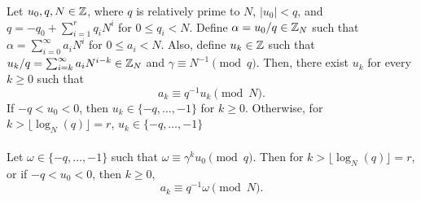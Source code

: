 \begin{theorem}\label{thm:10}
  Let $u_0,q,N\in\mathbb{Z}$, where $q$ is relatively prime to $N$,
  $\lvert u_0 \rvert < q$, and $q=-q_0+\sum_{i=1}^{r}q_iN^i$ for
  $0 \leq q_i < N$. Define $\alpha = u_0/q \in \mathbb{Z}_N$
  such that $\alpha = \sum_{i=0}^{\infty}a_iN^i$ for $0 \leq a_i < N$.
  Also, define $u_k\in\mathbb{Z}$ such that $u_k/q = \sum_{i=k}^{\infty}a_iN^{i-k} \in \mathbb{Z}_N$
  and $\gamma \equiv N^{-1} \pmod q$. Then,
  there exist $u_k$ for every $k\geq0$ such that
  \begin{equation}\label{eq:ak}
    a_k \equiv q^{-1}u_k \pmod N.
  \end{equation}
  If $-q<u_0<0$, then $u_k \in \{-q,\dots,-1\}$ for $k\geq0$.
  Otherwise, for $k>\lfloor \log_N(q) \rfloor=r$, $u_k \in \{-q,\dots,-1\}$
  \\ \\
  Let $\omega \in \{-q,\dots,-1\}$ such that $\omega \equiv \gamma^k u_0 \pmod q$.
  Then for $k>\lfloor \log_N(q) \rfloor=r$, or if $-q<u_0<0$, then $k\geq0$,
  \begin{equation}\label{eq:ak-omega}
    a_k \equiv q^{-1}\omega \pmod N.
  \end{equation}
\end{theorem}
\noindent \\ 
